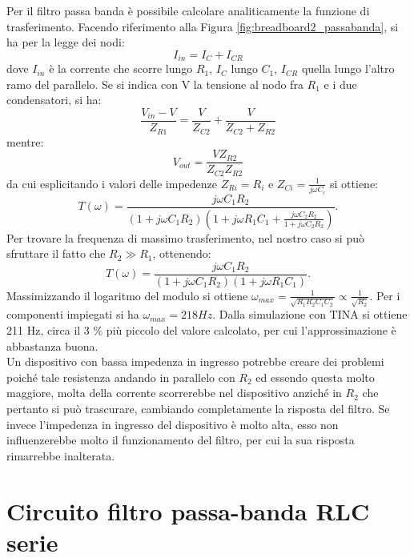 \documentclass[journal, a4paper]{IEEEtran}
\begin{document}
Per il filtro passa banda è possibile calcolare analiticamente la funzione di trasferimento. Facendo riferimento alla Figura \ref{fig:breadboard2_passabanda}, si ha per la legge dei nodi:
\begin{equation}
I_{in} = I_C + I_{CR}
\end{equation}
dove $I_{in}$ è la corrente che scorre lungo $R_1$, $I_C$ lungo $C_1$, $I_{CR}$ quella lungo l'altro ramo del parallelo. Se si indica con V la tensione al nodo fra $R_1$ e i due condensatori, si ha:
\begin{equation}
\frac{V_{in}-V}{Z_{R1}} = \frac{V}{Z_{C2}} + \frac{V}{Z_{C2}+Z_{R2}}
\end{equation}
mentre:
\begin{equation}
V_{out} = \frac{VZ_{R2}}{Z_{C2}Z_{R2}}
\end{equation}
da cui esplicitando i valori delle impedenze $Z_{Ri} = R_i$ e $Z_{Ci}=\frac{1}{j\omega C_i}$ si ottiene:
\begin{equation}
T(\omega) = \frac{j\omega C_1R_2}{(1+j\omega C_1R_2)(1+j\omega R_1C_1+\frac{j\omega C_2R_2}{1+j\omega C_2R_2})}.
\end{equation}
Per trovare la frequenza di massimo trasferimento, nel nostro caso si può sfruttare il fatto che $R_2 \gg R_1$, ottenendo:
\begin{equation}
T(\omega) = \frac{j\omega C_1R_2}{(1+j\omega C_1R_2)(1+j\omega R_1C_1)}.
\end{equation}
Massimizzando il logaritmo del modulo si ottiene $\omega _{max} = \frac{1}{\sqrt{R_1R_2C_1C_2}} \propto \frac{1}{\sqrt{R_2}}$.
Per i componenti impiegati si ha $\omega _{max} = 218 Hz$. Dalla simulazione con TINA si ottiene 211 Hz, circa il 3 $\%$ più piccolo del valore calcolato, per cui l'approssimazione è abbastanza buona. \\
Un dispositivo con bassa impedenza in ingresso potrebbe creare dei problemi poiché tale resistenza andando in parallelo con $R_2$ ed essendo questa molto maggiore, molta della corrente scorrerebbe nel dispositivo anziché in $R_2$ che pertanto si può trascurare, cambiando completamente la risposta del filtro. Se invece l'impedenza in ingresso del dispositivo è molto alta, esso non influenzerebbe molto il funzionamento del filtro, per cui la sua risposta rimarrebbe inalterata.

\section{Circuito filtro passa-banda RLC serie}
\end{document}
